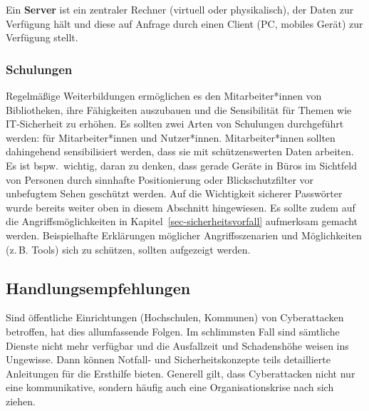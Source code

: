 \documentclass[
  11pt,
  letterpaper,
  DIV=11,
  twoside]{scrreprt}
\begin{document}
\begin{tcolorbox}[enhanced jigsaw, leftrule=.75mm, toprule=.15mm, left=2mm, opacityback=0, arc=.35mm, colback=white, breakable, colframe=quarto-callout-important-color-frame, rightrule=.15mm, bottomrule=.15mm]
\begin{minipage}[t]{5.5mm}
\textcolor{quarto-callout-important-color}{\faExclamation}
\end{minipage}%
\begin{minipage}[t]{\textwidth - 5.5mm}

Ein \textbf{Server} ist ein zentraler Rechner (virtuell oder
physikalisch), der Daten zur Verfügung hält und diese auf Anfrage durch
einen Client (PC, mobiles Gerät) zur Verfügung stellt.

\end{minipage}%
\end{tcolorbox}

\subsubsection{Schulungen}\label{schulungen}

Regelmäßige Weiterbildungen ermöglichen es den Mitarbeiter*innen von
Bibliotheken, ihre Fähigkeiten auszubauen und die Sensibilität für
Themen wie IT-Sicherheit zu erhöhen. Es sollten zwei Arten von
Schulungen durchgeführt werden: für Mitarbeiter*innen und Nutzer*innen.
Mitarbeiter*innen sollten dahingehend sensibilisiert werden, dass sie
mit schützenswerten Daten arbeiten. Es ist bspw.~wichtig, daran zu
denken, dass gerade Geräte in Büros im Sichtfeld von Personen durch
sinnhafte Positionierung oder Blickschutzfilter vor unbefugtem Sehen
geschützt werden. Auf die Wichtigkeit sicherer Passwörter wurde bereits
weiter oben in diesem Abschnitt hingewiesen. Es sollte zudem auf die
Angriffsmöglichkeiten in Kapitel~\ref{sec-sicherheitsvorfall} aufmerksam
gemacht werden. Beispielhafte Erklärungen möglicher Angriffsszenarien
und Möglichkeiten (z.\,B. Tools) sich zu schützen, sollten aufgezeigt
werden.

\subsection{Handlungsempfehlungen}\label{handlungsempfehlungen}

Sind öffentliche Einrichtungen (Hochschulen, Kommunen) von Cyberattacken
betroffen, hat dies allumfassende Folgen. Im schlimmsten Fall sind
sämtliche Dienste nicht mehr verfügbar und die Ausfallzeit und
Schadenshöhe weisen ins Ungewisse. Dann können Notfall- und
Sicherheitskonzepte teils detaillierte Anleitungen für die Ersthilfe
bieten. Generell gilt, dass Cyberattacken nicht nur eine kommunikative,
sondern häufig auch eine Organisationskrise nach sich ziehen.
\end{document}
